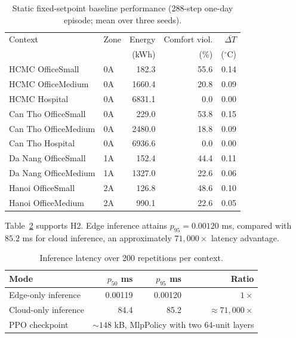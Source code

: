 \documentclass[runningheads,a4paper]{llncs}
\begin{document}
\begin{table}[t]
\centering
\caption{Static fixed-setpoint baseline performance (288-step one-day episode; mean over three seeds).}
\label{tab:baselines}
\scriptsize
\begin{tabular}{llrrr}
\toprule
Context & Zone & Energy & Comfort viol. & $\overline{\Delta T}$\\
 & & (kWh) & (\%) & ($^\circ$C)\\
\midrule
HCMC OfficeSmall & 0A & 182.3 & 55.6 & 0.14\\
HCMC OfficeMedium & 0A & 1660.4 & 20.8 & 0.09\\
HCMC Hospital & 0A & 6831.1 & 0.0 & 0.00\\
Can Tho OfficeSmall & 0A & 229.0 & 53.8 & 0.15\\
Can Tho OfficeMedium & 0A & 2480.0 & 18.8 & 0.09\\
Can Tho Hospital & 0A & 6936.6 & 0.0 & 0.00\\
Da Nang OfficeSmall & 1A & 152.4 & 44.4 & 0.11\\
Da Nang OfficeMedium & 1A & 1327.0 & 22.6 & 0.06\\
Hanoi OfficeSmall & 2A & 126.8 & 48.6 & 0.10\\
Hanoi OfficeMedium & 2A & 990.1 & 22.6 & 0.05\\
\bottomrule
\end{tabular}
\end{table}

Table~\ref{tab:latency} supports H2. Edge inference attains $p_{95}=0.00120$ ms, compared with $85.2$ ms for cloud inference, an approximately $71{,}000\times$ latency advantage.

\begin{table}[t]
\centering
\caption{Inference latency over 200 repetitions per context.}
\label{tab:latency}
\begin{tabular}{lrrr}
\toprule
Mode & $p_{50}$ ms & $p_{95}$ ms & Ratio\\
\midrule
Edge-only inference & 0.00119 & 0.00120 & $1\times$\\
Cloud-only inference & 84.4 & 85.2 & $\approx71{,}000\times$\\
PPO checkpoint & \multicolumn{3}{c}{$\sim148$ kB, MlpPolicy with two 64-unit layers}\\
\bottomrule
\end{tabular}
\end{table}
\end{document}
